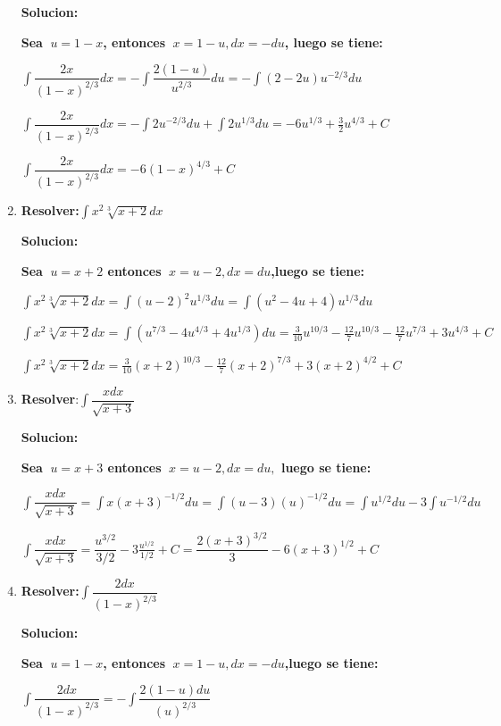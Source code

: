 \documentclass[10pt,a4paper]{book}
\newcommand{\ds}{\displaystyle}
\begin{document}
\begin{enumerate}
        \textbf{Solucion:}

        \textbf{Sea $\ds\ u=1-x$, entonces $\ds\ x=1-u, dx=-du$, luego se tiene:}

        $\ds\int\dfrac{2x}{(1-x)^{2/3}}dx=-\int\dfrac{2(1-u)}{u^{2/3}}du=-\int(2-2u)u^{-2/3}du$

        $\ds\int\dfrac{2x}{(1-x)^{2/3}}dx=-\int 2u^{-2/3}du+\int 2u^{1/3}du=-6u^{1/3}+\frac{3}{2}u^{4/3}+C$

        $\ds\int\dfrac{2x}{(1-x)^{2/3}}dx=-6(1-x)^{4/3}+C$

    \vspace{0.5cm}
    \item \textbf{Resolver:}$\ds\int x^2\sqrt[3]{x+2}dx$
    
        \textbf{Solucion:}

        \textbf{Sea $\ds\ u=x+2$ entonces $\ds\ x=u-2,dx=du$,luego se tiene:}

        $\ds\int x^2\sqrt[3]{x+2}dx=\int(u-2)^2u^{1/3}du=\int(u^2-4u+4)u^{1/3}du$

        $\ds\int x^2\sqrt[3]{x+2}dx=\int\left(u^{7/3}-4u^{4/3}+4u^{1/3}\right)du=\frac{3}{10}u^{10/3}-\frac{12}{7}u^{10/3}
        -\frac{12}{7}u^{7/3}+3u^{4/3}+C$

        $\ds\int x^2\sqrt[3]{x+2}dx=\frac{3}{10}(x+2)^{10/3}-\frac{12}{7}(x+2)^{7/3}+3(x+2)^{4/2}+C$

    \vspace{0.5cm}
    \item \textbf{Resolver}:$\ds\int \dfrac{xdx}{\sqrt{x+3} }$
    
        \textbf{Solucion:}

        \textbf{Sea $\ds\ u=x+3$ entonces $\ds\ x=u-2,dx=du,$ luego se tiene:}

        $\ds\int \dfrac{xdx}{\sqrt{x+3}}=\int x(x+3)^{-1/2}du=\int(u-3)(u)^{-1/2}du=\int u^{1/2}du-3\int u^{-1/2}du$

        $\ds\int \dfrac{xdx}{\sqrt{x+3}}=\dfrac{u^{3/2}}{3/2}-3\frac{u^{1/2}}{1/2}+C=\dfrac{2(x+3)^{3/2}}{3}-6(x+3)^{1/2}+C$

    \vspace{0.5cm}
    \item \textbf{Resolver:}$\ds\int \dfrac{2dx}{(1-x)^{2/3}}$
    
        \textbf{Solucion:}
        
        \textbf{Sea $\ds\ u=1-x$, entonces $\ds\ x=1-u,dx=-du$,luego se tiene:}

        $\ds\int \dfrac{2dx}{(1-x)^{2/3}}=-\int\dfrac{2(1-u)du}{(u)^{2/3}}$


\end{enumerate}
\end{document}
